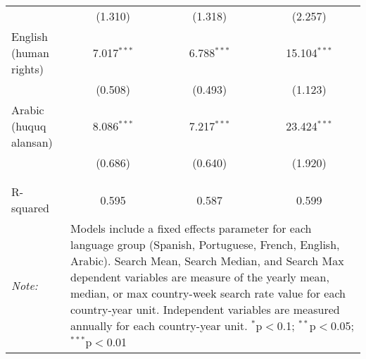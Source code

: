 \begin{table}[!htbp]
\begin{tabular}{@{\extracolsep{5pt}}lccc}
  & (1.310) & (1.318) & (2.257) \\ 
  English (human rights) & 7.017$^{***}$ & 6.788$^{***}$ & 15.104$^{***}$ \\ 
  & (0.508) & (0.493) & (1.123) \\ 
  Arabic (huquq alansan) & 8.086$^{***}$ & 7.217$^{***}$ & 23.424$^{***}$ \\ 
  & (0.686) & (0.640) & (1.920) \\ 
 \hline \\[-1.8ex] 
\hline 
\hline \\[-1.8ex] 
R-squared  & 0.595 & 0.587 & 0.599 \\ 
\textit{Note:}  & \multicolumn{3}{l}{\parbox[t]{8cm}{Models include a fixed effects parameter for each language group (Spanish, Portuguese, French, English, Arabic). Search Mean, Search Median, and Search Max dependent variables are measure of the yearly mean, median, or max country-week search rate value for each country-year unit. Independent variables are measured annually for each country-year unit. $^{*}$p$<$0.1; $^{**}$p$<$0.05; $^{***}$p$<$0.01}} \\ 
\end{tabular} 
\end{table} 
